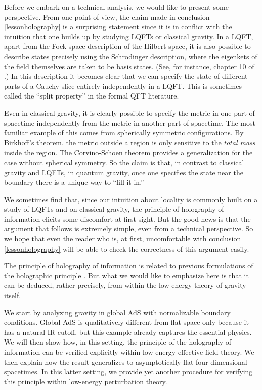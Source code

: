 \documentclass[12pt]{article}
\begin{document}
Before we embark on a technical analysis, we would like to present some perspective. From one point of view, the claim made in conclusion \ref{lessonholography} is  a surprising statement since it is in conflict with the intuition that one builds up by studying LQFTs or classical gravity. In a LQFT, apart from the Fock-space description of the Hilbert space, it is also possible to describe states precisely using the Schrodinger description, where the eigenkets of the field themselves are taken to be basis states. (See, for instance, chapter 10 of \cite{hatfield1991quantum}.) In this description it becomes clear that we can specify the state of different parts of a Cauchy slice entirely independently in a LQFT. This is sometimes called the ``split property'' \cite{Haag:1992hx} in the formal QFT literature.

Even in classical gravity, it is clearly possible to specify the metric in one part of spacetime independently from the metric in another part of spacetime. The most familiar example of this comes from spherically symmetric configurations.  By Birkhoff's theorem, the metric outside a region is only sensitive to the {\em total mass} inside the region. The Corvino-Schoen theorem \cite{Corvino:2003sp} provides a generalization for the case without spherical symmetry. So the claim is that, in contrast to classical gravity and LQFTs, in quantum gravity, once one specifies the state near the boundary there is a unique way to ``fill it in.''

We sometimes find that, since our intuition about locality is commonly built on a study of  LQFTs and on classical gravity, the principle of holography of information elicits some discomfort at first sight.
But the good news is that the argument that follows is extremely simple, even from a technical perspective. So we hope that even the reader who is, at first, uncomfortable with conclusion \ref{lessonholography} will be able to check the correctness of this argument easily.

The principle of holography of information is related to previous formulations of the holographic principle \cite{Susskind:1994vu,Bousso:2002ju}. But what we would like to emphasize here is that it can be deduced, rather precisely, from within the low-energy theory of gravity itself.

We start by analyzing gravity in global AdS with normalizable boundary conditions.  Global AdS is qualitatively different from flat space only because it has a natural IR-cutoff, but this example already captures the essential physics. We will then show how, in this setting, the principle of the holography of information can be verified explicitly within low-energy effective field theory. We then explain how the result generalizes to asymptotically flat four-dimensional spacetimes. In this latter setting, we provide yet another procedure for
verifying this principle within low-energy perturbation theory.
\end{document}
